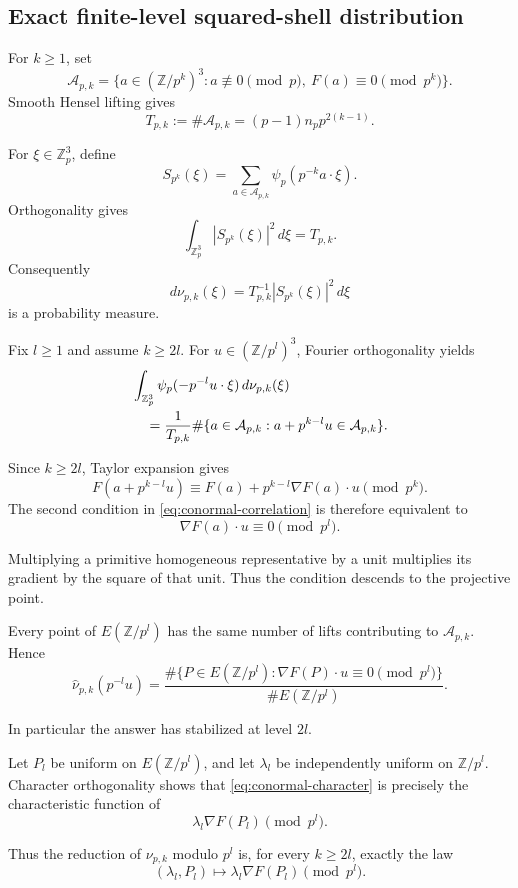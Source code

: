 \documentclass[11pt]{article}
\begin{document}
\subsection{Exact finite-level squared-shell distribution}

For $k\ge1$, set
\[
\mathcal A_{p,k}=
\{a\in(\mathbb Z/p^k)^3:
a\not\equiv0\pmod p,\ F(a)\equiv0\pmod{p^k}\}.
\]
Smooth Hensel lifting gives
\[
T_{p,k}:=\#\mathcal A_{p,k}
=(p-1)n_p p^{2(k-1)}.
\]

For $\xi\in\mathbb Z_p^3$, define
\[
S_{p^k}(\xi)=
\sum_{a\in\mathcal A_{p,k}}
\psi_p(p^{-k}a\cdot\xi).
\]
Orthogonality gives
\[
\int_{\mathbb Z_p^3}|S_{p^k}(\xi)|^2\,d\xi
=T_{p,k}.
\]
Consequently
\[
d\nu_{p,k}(\xi)=
T_{p,k}^{-1}|S_{p^k}(\xi)|^2\,d\xi
\]
is a probability measure.

Fix $l\ge1$ and assume $k\ge2l$.
For $u\in(\mathbb Z/p^l)^3$, Fourier
orthogonality yields
\begin{align}
&\int_{\mathbb Z_p^3}
\psi_p(-p^{-l}u\cdot\xi)\,d\nu_{p,k}(\xi)
\notag\\
&\quad=
\frac1{T_{p,k}}
\#\{a\in\mathcal A_{p,k}:
a+p^{k-l}u\in\mathcal A_{p,k}\}.
\label{eq:conormal-correlation}
\end{align}

Since $k\ge2l$, Taylor expansion gives
\[
F(a+p^{k-l}u)
\equiv F(a)+p^{k-l}\nabla F(a)\cdot u
\pmod{p^k}.
\]
The second condition in
\eqref{eq:conormal-correlation} is therefore
equivalent to
\[
\nabla F(a)\cdot u\equiv0\pmod{p^l}.
\]

Multiplying a primitive homogeneous representative
by a unit multiplies its gradient by the square
of that unit. Thus the condition descends to
the projective point.

Every point of $E(\mathbb Z/p^l)$ has the same
number of lifts contributing to $\mathcal A_{p,k}$.
Hence
\begin{equation}\label{eq:conormal-character}
\boxed{
\widehat\nu_{p,k}(p^{-l}u)=
\frac{
\#\{P\in E(\mathbb Z/p^l):
\nabla F(P)\cdot u\equiv0\pmod{p^l}\}
}{
\#E(\mathbb Z/p^l)
}.}
\end{equation}

In particular the answer has stabilized at level $2l$.

Let $P_l$ be uniform on $E(\mathbb Z/p^l)$,
and let $\lambda_l$ be independently uniform
on $\mathbb Z/p^l$.
Character orthogonality shows that
\eqref{eq:conormal-character} is precisely
the characteristic function of
\[
\lambda_l\nabla F(P_l)\pmod{p^l}.
\]

Thus the reduction of $\nu_{p,k}$ modulo $p^l$
is, for every $k\ge2l$, exactly the law
\begin{equation}\label{eq:finite-conormal-law}
\boxed{
(\lambda_l,P_l)\longmapsto
\lambda_l\nabla F(P_l)\pmod{p^l}.}
\end{equation}
\end{document}
